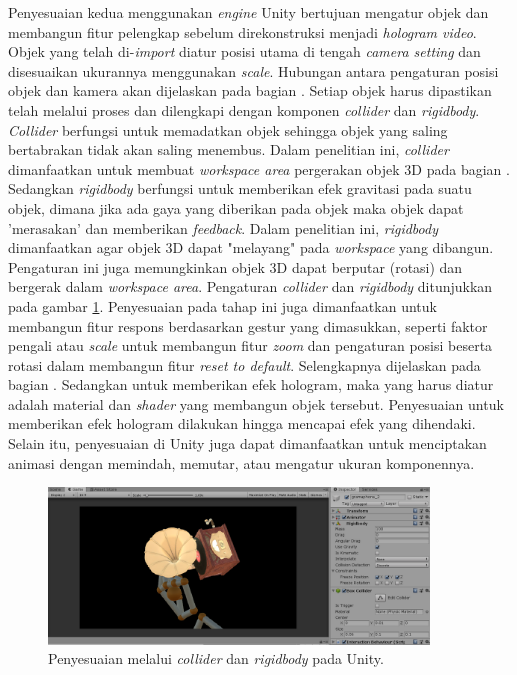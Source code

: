 		Penyesuaian kedua menggunakan \textit{engine} Unity bertujuan mengatur objek dan membangun fitur pelengkap sebelum direkonstruksi menjadi \textit{hologram video}. Objek yang telah di-\textit{import} diatur posisi utama di tengah \textit{camera setting} dan disesuaikan ukurannya menggunakan \textit{scale}. Hubungan antara pengaturan posisi objek dan kamera akan dijelaskan pada bagian . Setiap objek harus dipastikan telah melalui proses  dan dilengkapi dengan komponen  \textit{collider} dan \textit{rigidbody}. \textit{Collider} berfungsi untuk memadatkan objek sehingga objek yang saling bertabrakan tidak akan saling menembus. Dalam penelitian ini, \textit{collider} dimanfaatkan untuk membuat \textit{workspace area} pergerakan objek 3D pada bagian . Sedangkan \textit{rigidbody} berfungsi untuk memberikan efek gravitasi pada suatu objek, dimana jika ada gaya yang diberikan pada objek maka objek dapat 'merasakan' dan memberikan \textit{feedback}. Dalam penelitian ini, \textit{rigidbody} dimanfaatkan agar objek 3D dapat "melayang" pada \textit{workspace} yang dibangun. Pengaturan ini juga memungkinkan objek 3D dapat berputar (rotasi) dan bergerak dalam \textit{workspace area}. Pengaturan \textit{collider} dan \textit{rigidbody} ditunjukkan pada gambar \ref{fig:unity_colgid}. Penyesuaian pada tahap ini juga dimanfaatkan untuk membangun fitur respons berdasarkan gestur yang dimasukkan, seperti faktor pengali atau \textit{scale} untuk membangun fitur \textit{zoom} dan pengaturan posisi beserta rotasi dalam membangun fitur \textit{reset to default}. Selengkapnya dijelaskan pada bagian . Sedangkan untuk memberikan efek hologram, maka yang harus diatur adalah material dan \textit{shader} yang membangun objek tersebut. Penyesuaian untuk memberikan efek hologram dilakukan hingga mencapai efek yang dihendaki. Selain itu, penyesuaian di Unity juga dapat dimanfaatkan untuk menciptakan animasi dengan memindah, memutar, atau mengatur ukuran komponennya.
		\begin{figure} [H]
			\includegraphics[width=0.9\textwidth]{img/bab3/unity_colgid.png}
			\caption{Penyesuaian melalui \textit{collider} dan \textit{rigidbody} pada Unity.}
			\label{fig:unity_colgid}
		\end{figure}
